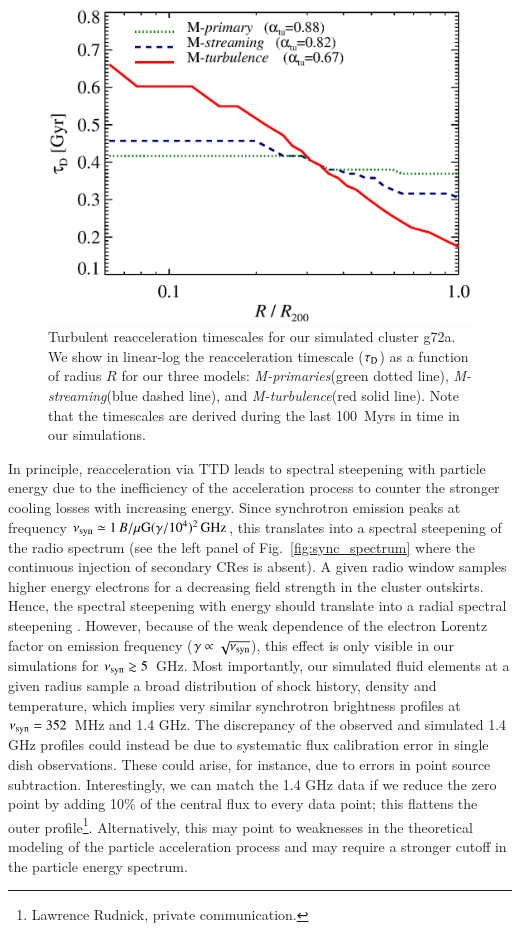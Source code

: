 \documentclass[fleqn,usenatbib,useAMS]{mnras}
\newcommand{\Mstream}{{\it M-streaming}\xspace}
\newcommand{\Mflatturb}{{\it M-turbulence}\xspace}
\newcommand{\Mprimary}{{\it M-primaries}\xspace}
\begin{document}
\begin{figure}
  \includegraphics[width=1.0\columnwidth]{tau_reacc.eps}
  \caption{Turbulent reacceleration timescales for our simulated
    cluster g72a. We show in linear-log the reacceleration timescale
    ($\tau_{\rm D}$) as a function of radius $R$ for our three models:
    \Mprimary (green dotted line), \Mstream (blue dashed line), and
    \Mflatturb (red solid line). Note that the timescales are derived
    during the last 100~Myrs in time in our simulations.}
  \label{fig:tauD}
\end{figure}

In principle, reacceleration via TTD leads to spectral steepening with
particle energy due to the inefficiency of the acceleration process to
counter the stronger cooling losses with increasing energy. Since
synchrotron emission peaks at frequency $\nu_{\mathrm{syn}}\simeq 1\,
B/\mu{\mathrm{G}} (\gamma/10^4)^2\,{\mathrm{GHz}}$, this translates into a
spectral steepening of the radio spectrum (see the left panel of
Fig.~\ref{fig:sync_spectrum} where the continuous injection of
secondary CRes is absent). A given radio window samples higher energy
electrons for a decreasing field strength in the cluster
outskirts. Hence, the spectral steepening with energy should translate
into a radial spectral steepening \citep{brunetti12}. However, because
of the weak dependence of the electron Lorentz factor on emission
frequency ($\gamma\propto\sqrt{\nu_{\mathrm{syn}}}$), this effect is only
visible in our simulations for $\nu_{\mathrm{syn}}\gtrsim5$~GHz. Most
importantly, our simulated fluid elements at a given radius sample a
broad distribution of shock history, density and temperature, which
implies very similar synchrotron brightness profiles at
$\nu_{\mathrm{syn}}=352$~MHz and 1.4 GHz. The discrepancy of the observed
and simulated 1.4 GHz profiles could instead be due to systematic flux
calibration error in single dish observations. These could arise, for
instance, due to errors in point source subtraction. Interestingly, we
can match the 1.4 GHz data if we reduce the zero point by adding 10\%
of the central flux to every data point; this flattens the outer
profile\footnote{Lawrence Rudnick, private communication.}.
Alternatively, this may point to weaknesses in the theoretical
modeling of the particle acceleration process and may require a
stronger cutoff in the particle energy spectrum.
\end{document}
